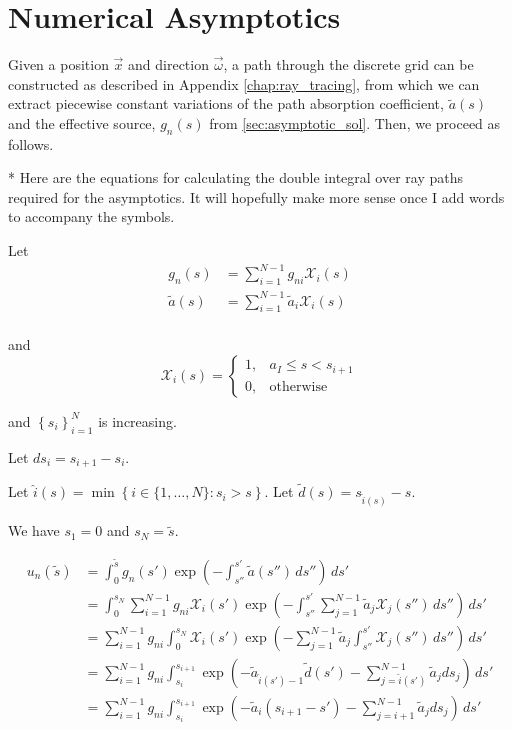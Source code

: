 \section{Numerical Asymptotics}

Given a position $\vec{x}$ and direction $\vec{\omega}$, a path through the discrete grid can be constructed as described in Appendix \ref{chap:ray_tracing}, from which we can extract piecewise constant variations of the path absorption coefficient, $\tilde{a}(s)$ and the effective source, $g_n(s)$ from \ref{sec:asymptotic_sol}.
Then, we proceed as follows.

* Here are the equations for calculating the double integral over ray paths
required for the asymptotics. It will hopefully make more sense once I add words
to accompany the symbols.

Let
\begin{align}
  g_n(s) &= \sum_{i=1}^{N-1}g_{ni}\mathcal{X}_i(s) \\
  \tilde{a}(s) &= \sum_{i=1}^{N-1}\tilde{a}_{i}\mathcal{X}_i(s) \\
\end{align}

and
\begin{equation}
  \mathcal{X}_i(s) = \begin{cases}
    1, & a_I \leq s < s_{i+1} \\
    0, & \mbox{otherwise}
    \end{cases}
\end{equation}

and $\left\{s_i\right\}_{i=1}^N$ is increasing.

Let $ds_i = s_{i+1} - s_i$.

Let $\hat{i}(s) = \min\left\{ i \in \{1,\ldots,N\} : s_i>s \right\}$.
Let $\tilde{d}(s) = s_{\hat{i}(s)}-s$.

We have $s_1 = 0$ and $s_N = \tilde{s}$.


\begin{align}
  u_n(\tilde{s}) &= \int_0^{\tilde{s}}g_n(s')\exp\left( -\int_{s''}^{s'}\tilde{a}(s'')\,ds'' \right)\, ds' \\
  &= \int_0^{s_N} \sum_{i=1}^{N-1}g_{ni}\mathcal{X}_i(s') \exp\left( -\int_{s''}^{s'}\sum_{j=1}^{N-1}\tilde{a}_{j}\mathcal{X}_j(s'')\,ds'' \right)\, ds' \\
  &= \sum_{i=1}^{N-1}g_{ni}\int_0^{s_N} \mathcal{X}_i(s') \exp\left( -\sum_{j=1}^{N-1}\tilde{a}_{j}\int_{s''}^{s'}\mathcal{X}_j(s'')\,ds'' \right)\, ds' \\
  &= \sum_{i=1}^{N-1}g_{ni}\int_{s_i}^{s_{i+1}}  \exp\left(-\tilde{a}_{\hat{i}(s')-1}\tilde{d}(s') -\sum_{j=\hat{i}(s')}^{N-1}\tilde{a}_{j}ds_j\right)\, ds' \\
  &= \sum_{i=1}^{N-1}g_{ni}\int_{s_i}^{s_{i+1}}  \exp\left(-\tilde{a}_{i}(s_{i+1}-s') -\sum_{j=i+1}^{N-1}\tilde{a}_{j}ds_j\right)\, ds'
\end{align}


